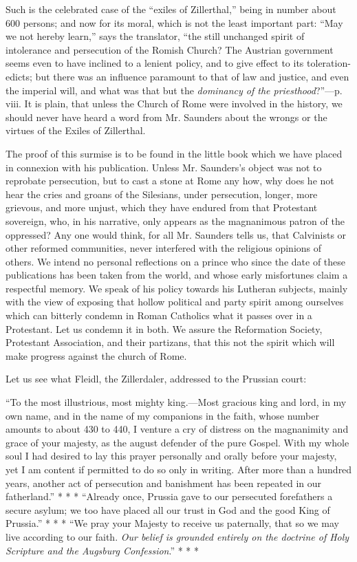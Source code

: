 Such is the celebrated case of the ``exiles of
Zillerthal,'' being in number about 600 persons; and now for its moral,
which is not the least important part: ``May we not hereby learn,'' says
the translator, ``the still unchanged spirit of intolerance and
persecution of the Romish Church? The Austrian government seems even to
have inclined to a lenient policy, and to give effect to its
toleration-edicts; but there was an influence paramount to that of law
and justice, and even the imperial will, and what was that but the \emph{dominancy
of the priesthood}?''—p. viii. It is plain, that unless the Church
of Rome were involved in the history, we should never have heard a word
from Mr. Saunders about the wrongs or the virtues of the Exiles of
Zillerthal.

The proof of this surmise is to be found in the
little book which we have placed in connexion with his publication.
Unless Mr. Saunders's object was not to reprobate persecution, but to
cast a stone at Rome any how, why does he not hear the cries and groans
of the Silesians, under persecution, longer, more grievous, and more
unjust, which they have endured from that Protestant sovereign, who, in
his narrative, only appears as the magnanimous patron of the oppressed?
Any one would think, for all Mr. Saunders tells us, that
Calvinists or other reformed communities, never interfered with the
religious opinions of others. We intend no personal reflections on a
prince who since the date of these publications has been taken from the
world, and whose early misfortunes claim a respectful memory. We speak
of his policy towards his Lutheran subjects, mainly with the view of
exposing that hollow political and party spirit among ourselves which
can bitterly condemn in Roman Catholics what it passes over in a
Protestant. Let us condemn it in both. We assure the Reformation
Society, Protestant Association, and their partizans, that this not the
spirit which will make progress against the church of Rome.

Let us see what Fleidl, the Zillerdaler, addressed
to the Prussian court:

``To the most illustrious, most
mighty king.—Most gracious king and lord, in my own name, and in the
name of my companions in the faith, whose number amounts to about 430 to
440, I venture a cry of distress on the magnanimity and grace of your
majesty, as the august defender of the pure Gospel. With my whole soul I
had desired to lay this prayer personally and orally before your
majesty, yet I am content if permitted to do so only in writing. After
more than a hundred years, another act of persecution and banishment has
been repeated in our fatherland.'' *
* *
``Already once, Prussia gave to our persecuted forefathers a
secure asylum; we too have placed all our trust in God and the good King
of Prussia.'' * *
* ``We
pray your Majesty to receive us paternally, that so we may live
according to our faith. \emph{Our belief is grounded entirely on the
doctrine of Holy Scripture and the Augsburg Confession}.''
* *
*

